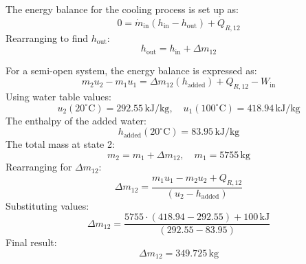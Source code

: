 The energy balance for the cooling process is set up as:  
\[
0 = \dot{m}_{\text{in}} (h_{\text{in}} - h_{\text{out}}) + \dot{Q}_{R,12}
\]  
Rearranging to find \( h_{\text{out}} \):  
\[
h_{\text{out}} = h_{\text{in}} + \Delta m_{12}
\]  

For a semi-open system, the energy balance is expressed as:  
\[
m_2 u_2 - m_1 u_1 = \Delta m_{12} (h_{\text{added}}) + Q_{R,12} - W_{\text{in}}
\]  
Using water table values:  
\[
u_2 (20^\circ\text{C}) = 292.55 \, \text{kJ/kg}, \quad u_1 (100^\circ\text{C}) = 418.94 \, \text{kJ/kg}
\]  
The enthalpy of the added water:  
\[
h_{\text{added}} (20^\circ\text{C}) = 83.95 \, \text{kJ/kg}
\]  
The total mass at state 2:  
\[
m_2 = m_1 + \Delta m_{12}, \quad m_1 = 5755 \, \text{kg}
\]  
Rearranging for \( \Delta m_{12} \):  
\[
\Delta m_{12} = \frac{m_1 u_1 - m_2 u_2 + Q_{R,12}}{(u_2 - h_{\text{added}})}
\]  
Substituting values:  
\[
\Delta m_{12} = \frac{5755 \cdot (418.94 - 292.55) + 100 \, \text{kJ}}{(292.55 - 83.95)}
\]  
Final result:  
\[
\Delta m_{12} = 349.725 \, \text{kg}
\]